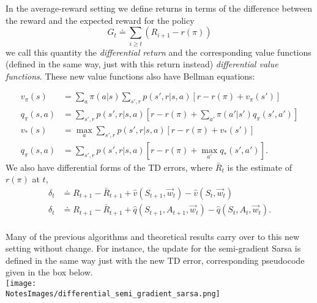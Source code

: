 In the average-reward setting we define returns in terms of the difference between the reward and the expected reward for the policy
\begin{equation}
    G_t \doteq \sum_{i \geq t} \left(R_{i+1} - r(\pi)\right)
\end{equation}
we call this quantity the \emph{differential return} and the corresponding value functions (defined in the same way, just with this return instead) \emph{differential value functions}. These new value functions also have Bellman equations:

\begin{align}
    v_\pi(s) &= \sum_a \pi(a \vert{} s) \sum_{s', r} p(s', r \vert{} s, a) \left[ r - r(\pi) + v_\pi(s')\right] \\
    q_\pi(s, a) &= \sum_{s', r} p(s', r \vert{} s, a) \left[ r - r(\pi) + \sum_{a'} \pi(a' \vert{} s') q_\pi(s', a')\right] \\
    v_*(s) &= \max_a \sum_{s', r} p(s', r \vert{} s, a) \left[ r - r(\pi) + v_*(s')\right] \\
    q_\pi(s, a) &= \sum_{s', r} p(s', r \vert{} s, a) \left[ r - r(\pi) + \max_{a'} q_*(s', a')\right].
\end{align}
We also have differential forms of the TD errors, where $\bar{R}_t$ is the estimate of $r(\pi)$ at $t$,
\begin{align}
    \delta_t &\doteq R_{t+1} - \bar{R}_{t+1} + \hat{v}(S_{t+1}, \vec{w}_t) - \hat{v}(S_t, \vec{w}_t)\\
    \delta_t &\doteq R_{t+1} - \bar{R}_{t+1} + \hat{q}(S_{t+1}, A_{t+1}, \vec{w}_t) - \hat{q}(S_t, A_t, \vec{w}_t).
\end{align}\\

Many of the previous algorithms and theoretical results carry over to this new setting without change. For instance, the update for the semi-gradient Sarsa is defined in the same way just with the new TD error, corresponding pseudocode given in the box below.\\

\texttt{[image: \\NotesImages/differential\_semi\_gradient\_sarsa.png]}\\

